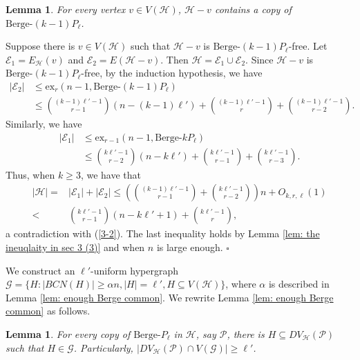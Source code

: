 \documentclass[12pt]{article}%
\newtheorem{lemma}[theorem]{Lemma}
\newenvironment{proof}{{\noindent\it Proof.}}{\hfill $\square$\par}
\newcommand{\ber}{\text{Berge-}}
\newcommand{\mh}{\mathcal{H}}
\newcommand{\mg}{\mathcal{G}}
\begin{document}
\begin{lemma}\label{lem: delete one vertex remains many P2l}
     For every vertex $v\in V(\mathcal{H})$, $\mh-v$ contains a copy of $\ber (k-1)P_{\ell}$.
 \end{lemma}
 \begin{proof} Suppose there is $v\in V(\mathcal{H})$ such that
  $\mh-v$ is $\ber (k-1)P_{\ell}$-free. Let $\mathcal{E}_1=E_\mh(v)$ and $\mathcal{E}_2=E(\mh-v)$. Then  $\mh=\mathcal{E}_1\cup \mathcal{E}_2$.
     Since $\mh-v$ is $\ber (k-1)P_{\ell}$-free, by the induction hypothesis,  we have
     \begin{equation*}
          \begin{aligned}
              |\mathcal{E}_2|&\leq \mathrm{ex}_{r}(n-1,\ber(k-1)P_{\ell})\\
              &\leq {(k-1)\ell'-1\choose r-1}(n-(k-1)\ell')+{(k-1)\ell'-1\choose r}+\binom{(k-1)\ell'-1}{r-2}.
          \end{aligned}
      \end{equation*}
      Similarly, we have
      \begin{equation*}
          \begin{aligned}
              |\mathcal{E}_1|&\leq \mathrm{ex}_{r-1}(n-1,\ber kP_{\ell})\\
              &\leq \binom{k\ell'-1}{r-2}(n-k\ell')+\binom{k\ell'-1}{r-1}+\binom{k\ell'-1}{r-3}.
          \end{aligned}
      \end{equation*}
      Thus, when  $k\geq 3$, we have that
     \begin{equation*}
     \begin{aligned}    |\mathcal{H}|=&|\mathcal{E}_1|+|\mathcal{E}_2|\leq \left(\binom{(k-1)\ell'-1}{r-1}+\binom{k\ell'-1}{r-2}\right)n+O_{k,r,\ell}(1)\\
             <& {k\ell'-1\choose r-1}(n-k\ell'+1)+{k\ell'-1\choose r},
         \end{aligned}
     \end{equation*}
     a contradiction with (\ref{3-2}).
     The last inequality holds by Lemma \ref{lem: the ineuqlaity in sec 3 (3)} and when $n$ is large enough.
 \end{proof}


We construct an $\ell'$-uniform hypergraph $\mg=\{H:|BCN(H)|\ge \alpha n,|H|=\ell',H\subseteq V(\mh)\}$, where $\alpha$ is described in Lemma \ref{lem: enough Berge common}. %
We rewrite Lemma \ref{lem: enough Berge common} as follows.
  \begin{lemma}\label{pro: intersecting A with ell}
    For  every copy of $\ber P_{\ell}$ in $\mh$, say $\mathcal{P}$, there is $H\subseteq DV_\mh(\mathcal{P})$  such that  $H\in \mg$. Particularly, $|DV_\mh(\mathcal{P})\cap V(\mg)|\geq \ell'$.
\end{lemma}
\end{document}
